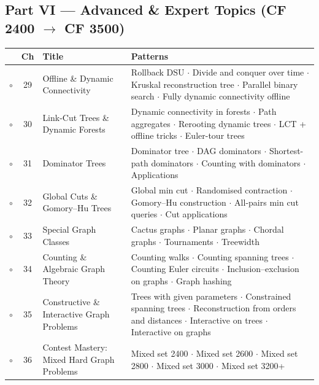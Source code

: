 \subsection*{Part VI --- Advanced \& Expert Topics (CF 2400 $\to$ CF 3500)}
\begin{tabularx}{\linewidth}{@{}c c >{\raggedright\arraybackslash}p{3.6cm} X@{}}
\toprule
& \textbf{Ch} & \textbf{Title} & \textbf{Patterns} \\
\midrule
$\circ$ & 29 & Offline \& Dynamic Connectivity & Rollback DSU $\cdot$ Divide and conquer over time $\cdot$ Kruskal reconstruction tree $\cdot$ Parallel binary search $\cdot$ Fully dynamic connectivity offline \\
$\circ$ & 30 & Link-Cut Trees \& Dynamic Forests & Dynamic connectivity in forests $\cdot$ Path aggregates $\cdot$ Rerooting dynamic trees $\cdot$ LCT + offline tricks $\cdot$ Euler-tour trees \\
$\circ$ & 31 & Dominator Trees & Dominator tree $\cdot$ DAG dominators $\cdot$ Shortest-path dominators $\cdot$ Counting with dominators $\cdot$ Applications \\
$\circ$ & 32 & Global Cuts \& Gomory--Hu Trees & Global min cut $\cdot$ Randomised contraction $\cdot$ Gomory--Hu construction $\cdot$ All-pairs min cut queries $\cdot$ Cut applications \\
$\circ$ & 33 & Special Graph Classes & Cactus graphs $\cdot$ Planar graphs $\cdot$ Chordal graphs $\cdot$ Tournaments $\cdot$ Treewidth \\
$\circ$ & 34 & Counting \& Algebraic Graph Theory & Counting walks $\cdot$ Counting spanning trees $\cdot$ Counting Euler circuits $\cdot$ Inclusion--exclusion on graphs $\cdot$ Graph hashing \\
$\circ$ & 35 & Constructive \& Interactive Graph Problems & Trees with given parameters $\cdot$ Constrained spanning trees $\cdot$ Reconstruction from orders and distances $\cdot$ Interactive on trees $\cdot$ Interactive on graphs \\
$\circ$ & 36 & Contest Mastery: Mixed Hard Graph Problems & Mixed set 2400 $\cdot$ Mixed set 2600 $\cdot$ Mixed set 2800 $\cdot$ Mixed set 3000 $\cdot$ Mixed set 3200+ \\
\bottomrule
\end{tabularx}
\endgroup
